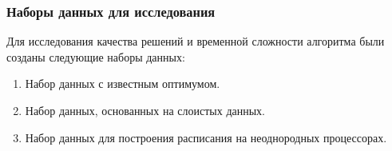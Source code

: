 \begin{frame}
    \frametitle{Наборы данных для исследования}
    Для исследования качества решений и временной сложности алгоритма были созданы следующие наборы данных:
    \begin{enumerate}
        \item Набор данных с известным оптимумом.
        \item Набор данных, основанных на слоистых данных.
        \item Набор данных для построения расписания на неоднородных процессорах.
    \end{enumerate}
\end{frame}

